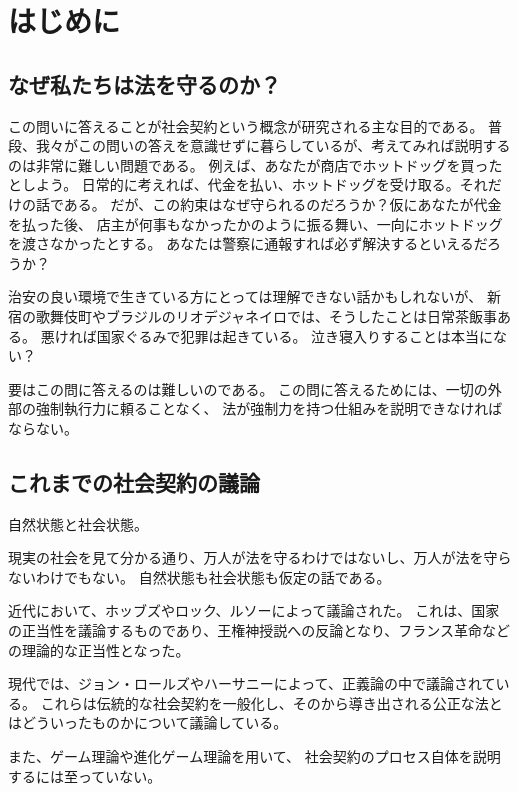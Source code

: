 
\chapter{はじめに}

  \section{なぜ私たちは法を守るのか？}
  この問いに答えることが社会契約という概念が研究される主な目的である。
  普段、我々がこの問いの答えを意識せずに暮らしているが、考えてみれば説明するのは非常に難しい問題である。
  例えば、あなたが商店でホットドッグを買ったとしよう。
  日常的に考えれば、代金を払い、ホットドッグを受け取る。それだけの話である。
  だが、この約束はなぜ守られるのだろうか？仮にあなたが代金を払った後、
  店主が何事もなかったかのように振る舞い、一向にホットドッグを渡さなかったとする。
  あなたは警察に通報すれば必ず解決するといえるだろうか？
  
  治安の良い環境で生きている方にとっては理解できない話かもしれないが、
  新宿の歌舞伎町やブラジルのリオデジャネイロでは、そうしたことは日常茶飯事ある。
  悪ければ国家ぐるみで犯罪は起きている。
  泣き寝入りすることは本当にない？

  要はこの問に答えるのは難しいのである。
  この問に答えるためには、一切の外部の強制執行力に頼ることなく、
  法が強制力を持つ仕組みを説明できなければならない。

  \section{これまでの社会契約の議論}
  自然状態と社会状態。


  現実の社会を見て分かる通り、万人が法を守るわけではないし、万人が法を守らないわけでもない。
  自然状態も社会状態も仮定の話である。

  近代において、ホッブズやロック、ルソーによって議論された。
  これは、国家の正当性を議論するものであり、王権神授説への反論となり、フランス革命などの理論的な正当性となった。

  現代では、ジョン・ロールズやハーサニーによって、正義論の中で議論されている。
  これらは伝統的な社会契約を一般化し、そのから導き出される公正な法とはどういったものかについて議論している。

  また、ゲーム理論や進化ゲーム理論を用いて、
  社会契約のプロセス自体を説明するには至っていない。


